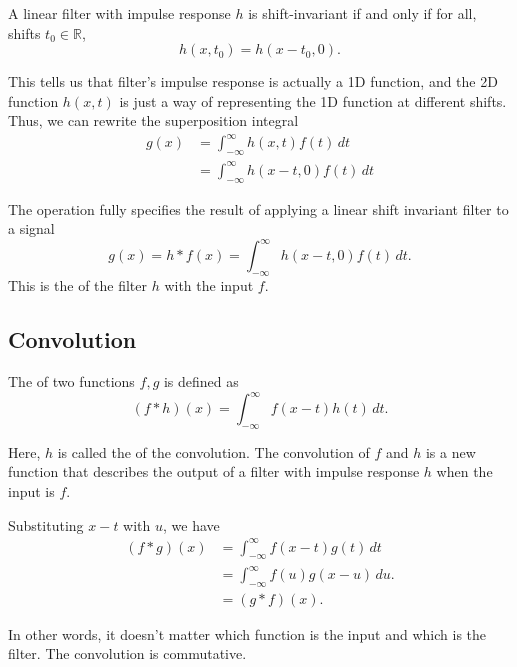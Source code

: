 \begin{theorem}
    A linear filter with  impulse response $h$ is shift-invariant if and only if for all, shifts $t_0 \in \mathbb{R}$, \[
        h(x, t_0) = h(x - t_0, 0).
    \]
\end{theorem}

This tells us that filter's impulse response is actually a 1D function, and the 2D function $h(x, t)$ is just a way of representing the 1D function at different shifts. Thus, we can rewrite the superposition integral \begin{align*}
    g(x) & = \int_{-\infty}^{\infty} h(x, t) f(t) \, dt     \\
         & = \int_{-\infty}^{\infty} h(x - t, 0) f(t) \, dt
\end{align*}

The operation fully specifies the result of applying a linear shift invariant filter to a signal \[
    g(x) = h \ast f(x) = \int_{-\infty}^{\infty} h(x - t, 0) f(t) \, dt.
\] This is the  of the filter $h$ with the input $f$.

\subsection{Convolution}

\begin{definition}[Convolution]\label{def:convolution}
    The  of two functions $f, g$ is defined as \[
        (f \ast h)(x) = \int_{-\infty}^{\infty} f(x - t) h(t) \, dt.
    \]
\end{definition}

Here, $h$ is called the  of the convolution. The convolution of $f$ and $h$ is a new function that describes the output of a filter with impulse response $h$ when the input is $f$.

\begin{remark}
    Substituting $x - t$ with $u$, we have
    \begin{align*}
        (f \ast g)(x) & = \int_{-\infty}^{\infty} f(x - t) g(t) \, dt  \\
                      & = \int_{-\infty}^{\infty} f(u) g(x - u) \, du. \\
                      & = (g \ast f)(x).
    \end{align*}
\end{remark}

In other words, it doesn't matter which function is the input and which is the filter. The convolution is commutative.


